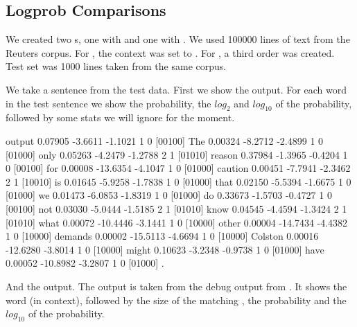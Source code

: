 \documentclass[a4paper,10pt,twoside]{report}
\begin{document}
\subsection{Logprob Comparisons}


We created two \lm{}s, one with \wopr{} and one with \srilm{}. We used
\num{100000} lines of text from the Reuters corpus. For
\wopr{}, the context was set to . For \srilm{}, a third
order \lm{} was created. Test set was \num{1000} lines taken from
the same corpus.


We take a sentence from the test data. First we show the \wopr{}
output. For each word in the test sentence we show the probability,
the $log_{2}$ and $log_{10}$ of the probability, followed by some
stats we will ignore for the moment.

\begin{wout}{\wopr{} output}
0.07905  -3.6611  -1.1021  1 0 [00100] The
0.00324  -8.2712  -2.4899  1 0 [01000] only
0.05263  -4.2479  -1.2788  2 1 [01010] reason
0.37984  -1.3965  -0.4204  1 0 [00100] for
0.00008 -13.6354  -4.1047  1 0 [01000] caution
0.00451  -7.7941  -2.3462  2 1 [10010] is
0.01645  -5.9258  -1.7838  1 0 [01000] that
0.02150  -5.5394  -1.6675  1 0 [01000] we
0.01473  -6.0853  -1.8319  1 0 [01000] do
0.33673  -1.5703  -0.4727  1 0 [00100] not
0.03030  -5.0444  -1.5185  2 1 [01010] know
0.04545  -4.4594  -1.3424  2 1 [01010] what
0.00072 -10.4446  -3.1441  1 0 [10000] other
0.00004 -14.7434  -4.4382  1 0 [10000] demands
0.00002 -15.5113  -4.6694  1 0 [10000] Colston
0.00016 -12.6280  -3.8014  1 0 [10000] might
0.10623  -3.2348  -0.9738  1 0 [01000] have
0.00052 -10.8982  -3.2807  1 0 [01000] .
\end{wout}

And the \srilm{} output. The output is taken from the debug output from
\srilm{}. It shows the word (in context), followed by the size of the
matching \ngram{}, the probability and the $log_{10}$ of the probability.
\end{document}
